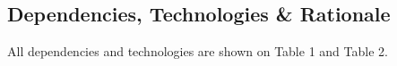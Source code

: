 \subsection{Dependencies, Technologies \& Rationale}
All dependencies and technologies are shown on Table 1 and Table 2.

